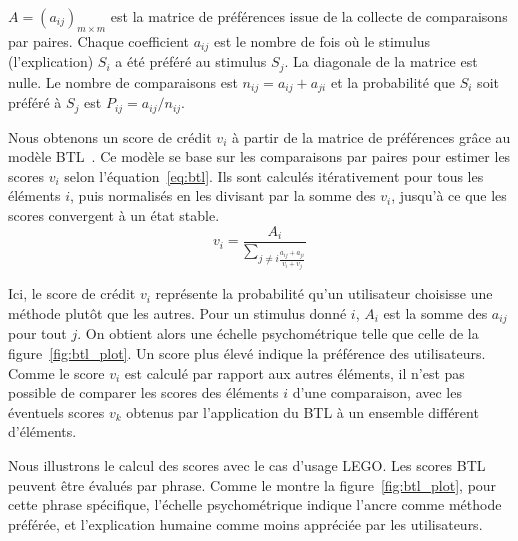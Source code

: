 $A = (a_{ij})_{m \times m}$ est la matrice de préférences issue de la collecte de comparaisons par paires. Chaque coefficient $a_{ij}$ est le nombre de fois où le stimulus (l'explication) $S_i$ a été préféré au stimulus $S_j$. La diagonale de la matrice est nulle.
Le nombre de comparaisons est $n_{ij} = a_{ij}+a_{ji}$ et la probabilité que $S_i$ soit préféré à $S_j$ est $P_{ij} = a_{ij}/n_{ij}$.

Nous obtenons un score de crédit $v_i$ à partir de la matrice de préférences grâce au modèle BTL~\cite{Bradley1952,Luce1959}. Ce modèle se base sur les comparaisons par paires pour estimer les scores $v_i$ selon l'équation~\ref{eq:btl}. Ils sont calculés itérativement pour tous les éléments $i$, puis normalisés en les divisant par la somme des $v_i$, jusqu'à ce que les scores convergent à un état stable.
\begin{equation} \label{eq:btl}
    v_i = \frac{A_i}{\sum_{j \neq i \frac{a_{ij}+a_{ji}}{v_i + v_j}}}
\end{equation}

Ici, le score de crédit $v_i$ représente la probabilité qu'un utilisateur choisisse une méthode plutôt que les autres. Pour un stimulus donné $i$, $A_i$ est la somme des $a_{ij}$ pour tout $j$.
On obtient alors une échelle psychométrique telle que celle de la figure~\ref{fig:btl_plot}. Un score plus élevé indique la préférence des utilisateurs. Comme le score $v_i$ est calculé par rapport aux autres éléments, il n'est pas possible de comparer les scores des éléments $i$ d'une comparaison, avec les éventuels scores $v_k$ obtenus par l'application du BTL à un ensemble différent d'éléments.

Nous illustrons le calcul des scores avec le cas d'usage LEGO. Les scores BTL peuvent être évalués par phrase. Comme le montre la figure~\ref{fig:btl_plot}, pour cette phrase spécifique, l'échelle psychométrique indique l'ancre comme méthode préférée, et l'explication humaine comme moins appréciée par les utilisateurs.

